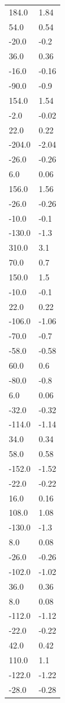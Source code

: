 \begin{longtable}{ll}
184.0 & 1.84 \\
54.0 & 0.54 \\
-20.0 & -0.2 \\
36.0 & 0.36 \\
-16.0 & -0.16 \\
-90.0 & -0.9 \\
154.0 & 1.54 \\
-2.0 & -0.02 \\
22.0 & 0.22 \\
-204.0 & -2.04 \\
-26.0 & -0.26 \\
6.0 & 0.06 \\
156.0 & 1.56 \\
-26.0 & -0.26 \\
-10.0 & -0.1 \\
-130.0 & -1.3 \\
310.0 & 3.1 \\
70.0 & 0.7 \\
150.0 & 1.5 \\
-10.0 & -0.1 \\
22.0 & 0.22 \\
-106.0 & -1.06 \\
-70.0 & -0.7 \\
-58.0 & -0.58 \\
60.0 & 0.6 \\
-80.0 & -0.8 \\
6.0 & 0.06 \\
-32.0 & -0.32 \\
-114.0 & -1.14 \\
34.0 & 0.34 \\
58.0 & 0.58 \\
-152.0 & -1.52 \\
-22.0 & -0.22 \\
16.0 & 0.16 \\
108.0 & 1.08 \\
-130.0 & -1.3 \\
8.0 & 0.08 \\
-26.0 & -0.26 \\
-102.0 & -1.02 \\
36.0 & 0.36 \\
8.0 & 0.08 \\
-112.0 & -1.12 \\
-22.0 & -0.22 \\
42.0 & 0.42 \\
110.0 & 1.1 \\
-122.0 & -1.22 \\
-28.0 & -0.28 \\

\end{longtable}
